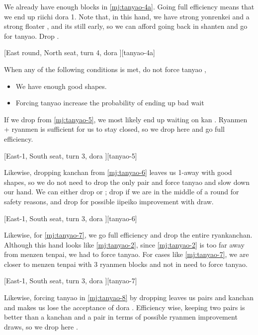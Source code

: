 \documentclass[12pt]{article}
\begin{document}
We already have enough blocks in \ref{mj:tanyao-4a}. Going full efficiency means that we end up riichi dora 1. Note that, in this hand, we have strong yonrenkei and a strong floater , and its still early, so we can afford going back in shanten and go for tanyao. Drop  \citep[pp.~70--71]{fkt}.

[East round, North seat, turn 4, dora ][tanyao-4a]

When any of the following conditions is met, do not force tanyao \citep[][p.~23]{zero-teyaku},

\begin{itemize}
\item We have enough good shapes.
\item Forcing tanyao increase the probability of ending up bad wait
\end{itemize}

If we drop  from \ref{mj:tanyao-5}, we most likely end up waiting on kan . Ryanmen + ryanmen is sufficient for us to stay closed, so we drop  here and go full efficiency.

[East-1, South seat, turn 3, dora ][tanyao-5]

Likewise, dropping kanchan from \ref{mj:tanyao-6} leaves us 1-away with good shapes, so we do not need to drop the only  pair and force tanyao and slow down our hand. We can either drop  or ; drop  if we are in the middle of a round for safety reasons, and drop  for possible iipeiko improvement with  draw.

[East-1, South seat, turn 3, dora ][tanyao-6]

Likewise, for \ref{mj:tanyao-7}, we go full efficiency and drop the entire ryankanchan. Although this hand looks like \ref{mj:tanyao-2}, since \ref{mj:tanyao-2} is too far away from menzen tenpai, we had to force tanyao. For cases like \ref{mj:tanyao-7}, we are closer to menzen tenpai with 3 ryanmen blocks and not in need to force tanyao.

[East-1, South seat, turn 3, dora ][tanyao-7]

Likewise, forcing tanyao in \ref{mj:tanyao-8} by dropping  leaves us pairs and kanchan and makes us lose the acceptance of dora . Efficiency wise, keeping two pairs is better than a kanchan and a pair in terms of possible ryanmen improvement draws, so we drop  here \citep[][pp.~32--33]{fkt}.
\end{document}
